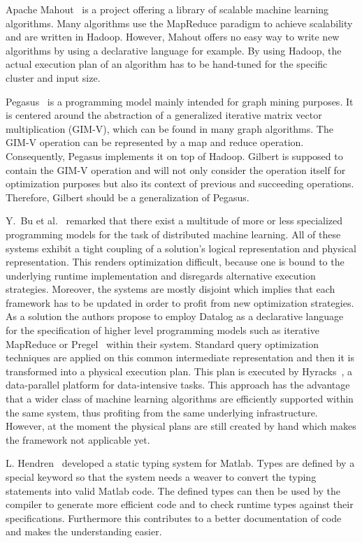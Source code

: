 \documentclass{dima}
\begin{document}
Apache Mahout~\cite{apache:a2011} is a project offering a library of scalable machine learning algorithms.
Many algorithms use the MapReduce paradigm to achieve scalability and are written in Hadoop.
However, Mahout offers no easy way to write new algorithms by using a declarative language for example.
By using Hadoop, the actual execution plan of an algorithm has to be hand-tuned for the specific cluster and input size.

Pegasus~\cite{kang:2009a} is a programming model mainly intended for graph mining purposes.
It is centered around the abstraction of a generalized iterative matrix vector multiplication (GIM-V), which can be found in many graph algorithms.
The GIM-V operation can be represented by a map and reduce operation.
Consequently, Pegasus implements it on top of Hadoop.
Gilbert is supposed to contain the GIM-V operation and will not only consider the operation itself for optimization purposes but also its context of previous and succeeding operations.
Therefore, Gilbert should be a generalization of Pegasus.

Y.~Bu et al.~\cite{bu:apa2012a} remarked that there exist a multitude of more or less specialized programming models for the task of distributed machine learning.
All of these systems exhibit a tight coupling of a solution's logical representation and physical representation.
This renders optimization difficult, because one is bound to the underlying runtime implementation and disregards alternative execution strategies.
Moreover, the systems are mostly disjoint which implies that each framework has to be updated in order to profit from new optimization strategies.
As a solution the authors propose to employ Datalog as a declarative language for the specification of higher level programming models such as iterative MapReduce or Pregel~\cite{malewicz:2010a} within their system.
Standard query optimization techniques are applied on this common intermediate representation and then it is transformed into a physical execution plan.
This plan is executed by Hyracks~\cite{borkar:2011a}, a data-parallel platform for data-intensive tasks.
This approach has the advantage that a wider class of machine learning algorithms are efficiently supported within the same system, thus profiting from the same underlying infrastructure.
However, at the moment the physical plans are still created by hand which makes the framework not applicable yet.

L. Hendren~\cite{hendren:2011a} developed a static typing system for Matlab.
Types are defined by a special keyword so that the system needs a weaver to convert the typing statements into valid Matlab code.
The defined types can then be used by the compiler to generate more efficient code and to check runtime types against their specifications.
Furthermore this contributes to a better documentation of code and makes the understanding easier.
\end{document}
